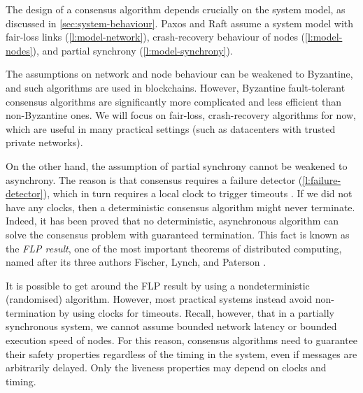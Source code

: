The design of a consensus algorithm depends crucially on the system model, as discussed in \autoref{sec:system-behaviour}.
Paxos and Raft assume a system model with fair-loss links (\autoref{l:model-network}), crash-recovery behaviour of nodes (\autoref{l:model-nodes}), and partial synchrony (\autoref{l:model-synchrony}).

The assumptions on network and node behaviour can be weakened to Byzantine, and such algorithms are used in blockchains.
However, Byzantine fault-tolerant consensus algorithms are significantly more complicated and less efficient than non-Byzantine ones.
We will focus on fair-loss, crash-recovery algorithms for now, which are useful in many practical settings (such as datacenters with trusted private networks).

On the other hand, the assumption of partial synchrony cannot be weakened to asynchrony.
The reason is that consensus requires a failure detector (\autoref{l:failure-detector}), which in turn requires a local clock to trigger timeouts \citep{Chandra:1996}.
If we did not have any clocks, then a deterministic consensus algorithm might never terminate.
Indeed, it has been proved that no deterministic, asynchronous algorithm can solve the consensus problem with guaranteed termination.
This fact is known as the \emph{FLP result}, one of the most important theorems of distributed computing, named after its three authors Fischer, Lynch, and Paterson \citep{Fischer:1985}.

It is possible to get around the FLP result by using a nondeterministic (randomised) algorithm.
However, most practical systems instead avoid non-termination by using clocks for timeouts.
Recall, however, that in a partially synchronous system, we cannot assume bounded network latency or bounded execution speed of nodes.
For this reason, consensus algorithms need to guarantee their safety properties regardless of the timing in the system, even if messages are arbitrarily delayed.
Only the liveness properties may depend on clocks and timing.


